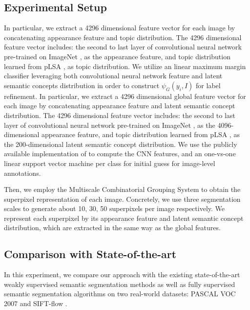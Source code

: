 \subsection{Experimental Setup}
\if
In particular, we extract a 4296 dimensional feature vector for each image by concatenating appearance feature and topic distribution. The 4296 dimensional feature vector includes: the second to last layer of convolutional neural network \cite{simonyan2014very} pre-trained on ImageNet \cite{russakovsky2014imagenet}, as the appearance feature, and topic distribution learned from pLSA \cite{hofmann1999probabilistic}, as topic distribution.
\fi
We utilize an linear maximum margin classifier leveraging both convolutional neural network feature and latent semantic concepts distribution in order to construct $\psi_{G}(y_i,I)$ for label refinement. In particular, we extract a 4296 dimensional global feature vector for each image by concatenating appearance feature and latent semantic concept distribution. The 4296 dimensional feature vector includes: the second to last layer of convolutional neural network \cite{simonyan2014very} pre-trained on ImageNet \cite{russakovsky2014imagenet}, as the 4096-dimensional appearance feature, and topic distribution learned from pLSA \cite{hofmann1999probabilistic}, as the 200-dimensional latent semantic concept distribution. We use the publicly available implementation of \cite{jia2014caffe} to compute the CNN features, and an one-vs-one linear support vector machine \cite{fan2008liblinear} per class for initial guess for image-level annotations.

Then, we employ the Multiscale Combinatorial Grouping System \cite{arbelaez2014multiscale} to obtain the superpixel representation of each image. Concretely, we use three segmentation scales to generate about 10, 30, 50 superpixels per image respectively. We represent each superpixel by its appearance feature and latent semantic concept distribution, which are extracted in the same way as the global features.

\subsection{Comparison with State-of-the-art}
In this experiment, we compare our approach with the existing state-of-the-art weakly supervised semantic segmentation methods as well as fully supervised semantic segmentation algorithms on two real-world datasets: PASCAL VOC 2007 \cite{pascal-voc-2007} and SIFT-flow \cite{liu2011nonparametric}.


